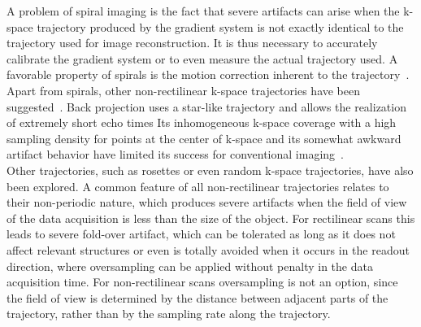 A problem of spiral imaging is the fact that severe artifacts can arise when the k-space trajectory produced by the gradient system is not exactly identical to the trajectory used for image reconstruction. It is thus necessary to accurately calibrate the gradient system or to even measure the actual trajectory used. 
A favorable property of spirals is the motion correction inherent to the trajectory~\cite{SpiralMRI3}. 
Apart from spirals, other non-rectilinear k-space trajectories have been suggested~\cite{NonRectlinear1,NonRectlinear2}. 
Back projection uses a star-like trajectory and allows the realization of extremely short echo times 
Its inhomogeneous k-space coverage with a high sampling density for points at the center of k-space and its somewhat awkward artifact behavior have limited its success for conventional imaging~\cite{SamplingStrategies}. \\
Other trajectories, such as rosettes or even random k-space trajectories, have also been explored. A common feature of all non-rectilinear trajectories relates to their non-periodic nature, which produces severe artifacts when the field of view of the data acquisition is less than the size of the object. For rectilinear scans this leads to severe fold-over artifact, which can be tolerated as long as it does not affect relevant structures or even is totally avoided when it occurs in the readout direction, where oversampling can be applied without penalty in the data acquisition time. For non-rectilinear scans oversampling is not an option, since the field of view is determined by the distance between adjacent parts of the trajectory, rather than by the sampling rate along the trajectory. 
